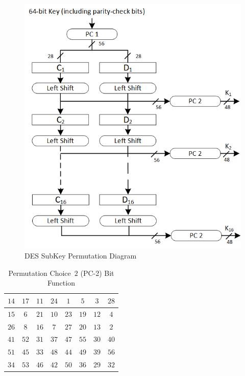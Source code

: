 \documentclass{article}
\begin{document}
\begin{figure} 
  \centering
  \includegraphics[scale=1.0]{des-key.png}
  \caption{DES SubKey Permutation Diagram}
  \label{des-key.png}
\end{figure}
\begin{table} [b!]
  \centering
\begin{tabular} {|c|c|c|c|c|c|c|c|} \hline
  $14$ & $17$ & $11$ & $24$ & $1$  & $5$  & $3$  & $28$ \\ \hline
  $15$ & $6$  & $21$ & $10$ & $23$ & $19$ & $12$ & $4$ \\ \hline
  $26$ & $8$  & $16$ & $7$  & $27$ & $20$ & $13$ & $2$ \\ \hline
  $41$ & $52$ & $31$ & $37$ & $47$ & $55$ & $30$ & $40$ \\ \hline
  $51$ & $45$ & $33$ & $48$ & $44$ & $49$ & $39$ & $56$ \\ \hline
  $34$ & $53$ & $46$ & $42$ & $50$ & $36$ & $29$ & $32$\\ \hline
\end{tabular}
\caption{Permutation Choice~$2$ (PC-2) Bit Function}
\label{pc2.tbl}
\end{table}
\end{document}
